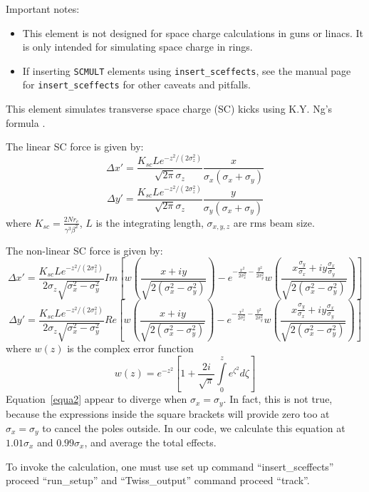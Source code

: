 Important notes:
\begin{itemize}
\item This element is not designed for space charge calculations in guns or linacs.  It is only intended for
  simulating space charge in rings. 
\item If inserting \verb|SCMULT| elements using \verb|insert_sceffects|, see the
  manual page for \verb|insert_sceffects| for other caveats and pitfalls.
\end{itemize}

This element simulates transverse space charge (SC) kicks using
K.Y. Ng's formula \cite{Xiao2007a}.

The linear SC force is given by:
\[
\Delta x'=\frac{K_{sc}Le^{-z^2/(2\sigma_z^2)}}{\sqrt{2\pi}\sigma_z}
\frac{x}{\sigma_x(\sigma_x+\sigma_y)}
\]
\begin{equation}
\Delta y'=\frac{K_{sc}Le^{-z^2/(2\sigma_z^2)}}{\sqrt{2\pi}\sigma_z}
\frac{y}{\sigma_y(\sigma_x+\sigma_y)}
\end{equation}
where $K_{sc}=\frac{2Nr_e}{\gamma^3\beta^2}$,
$L$ is the integrating length, $\sigma_{x,y,z}$ are rms beam size.

The non-linear SC force is given by:
\[
\Delta x'=\frac{K_{sc}Le^{-z^2/(2\sigma_z^2)}}{2\sigma_z\sqrt{\sigma_x^2-\sigma_y^2}}
Im\left [ w\left( \frac{x+iy}{\sqrt{2(\sigma_x^2-\sigma_y^2)}} \right)
-e^{-\frac{x^2}{2 \sigma_x^2}-\frac{y^2}{2 \sigma_y^2}}
w\left(\frac{x\frac{\sigma_y}{\sigma_x}+iy\frac{\sigma_x}{\sigma_y}}
{\sqrt{2(\sigma_x^2-\sigma_y^2)}}\right)\right ]
\]
\begin{equation}
\Delta y'=\frac{K_{sc}Le^{-z^2/(2\sigma_z^2)}}{2\sigma_z\sqrt{\sigma_x^2-\sigma_y^2}}
Re\left [ w\left( \frac{x+iy}{\sqrt{2(\sigma_x^2-\sigma_y^2)}} \right)
-e^{-\frac{x^2}{2 \sigma_x^2}-\frac{y^2}{2 \sigma_y^2}}
w\left(\frac{x\frac{\sigma_y}{\sigma_x}+iy\frac{\sigma_x}{\sigma_y}}
{\sqrt{2(\sigma_x^2-\sigma_y^2)}}\right)\right ]
\label{equa2}
\end{equation}
where $w(z)$ is the complex error function
\begin{equation}
w(z)=e^{-z^2}\left [ 1+\frac{2i}{\sqrt{\pi}}\int\limits_0^z e^{\zeta^2}d\zeta\right ]
\end{equation}
Equation~\ref{equa2} appear to diverge when $\sigma_x=\sigma_y$. In fact, this is not
true, because the expressions inside the square brackets will provide zero too at
$\sigma_x=\sigma_y$ to cancel the poles outside. In our code, we calculate this equation
at  $1.01 \sigma_x$ and $0.99\sigma_x$, and average the total effects. 
 
To invoke the calculation, one must use set up command
``insert\_sceffects'' proceed ``run\_setup'' and ``Twiss\_output''
command proceed ``track''.


